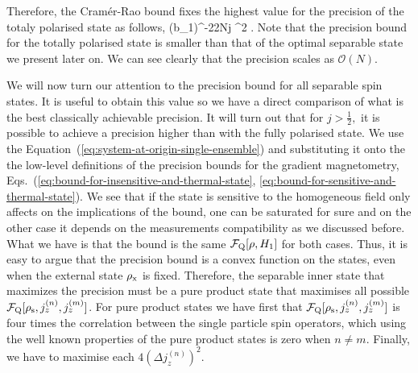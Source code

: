 Therefore, the Cram\'er-Rao bound fixes the highest value for the precision
of the totaly polarised state as follows,
\be
  (\Delta b_1)^{-2}\leq 2Nj \sigma^2 .
\ee
Note that the precision bound for the totally polarised state
is smaller than that of the optimal separable state we present later on.
We can see clearly that the precision scales as $\mathcal{O}(N).$


We will now turn our attention to
the precision bound for all separable spin states.
It is useful to obtain this value so we have a direct comparison of what is
the best classically achievable precision.
It will turn out that for $j>\frac{1}{2},$ it is possible
to achieve a precision higher than with the fully polarised state.
We use the Equation~(\ref{eq:system-at-origin-single-ensemble}) and substituting it onto the the low-level definitions of the precision bounds for the gradient magnetometry, Eqs.~(\ref{eq:bound-for-insensitive-and-thermal-state}, \ref{eq:bound-for-sensitive-and-thermal-state}).
We see that if the state is sensitive to the homogeneous field only affects on the implications of the bound, one can be saturated for sure and on the other case it depends on the measurements compatibility as we discussed before.
What we have is that the bound is the same $\mathcal{F}_{\text{Q}}[\rho, H_1]$ for both cases.
Thus, it is easy to argue that the precision bound is a convex function on the states, even when the external state $\rho_{\rm x}$ is fixed.
Therefore, the separable inner state that maximizes the precision must be a pure product state that maximises all possible $\mathcal{F}_{\text{Q}}[\rho_{\rm s}, j_z^{(n)}, j_z^{(m)}]$.%
For pure product states we have first that $\mathcal{F}_{\text{Q}}[\rho_{\rm s}, j_z^{(n)}, j_z^{(m)}]$ is four times the correlation between the single particle spin operators, which using the well known properties of the pure product states is  zero when $n \neq m$.
Finally, we have to maximise each $4(\Delta j_z^{(n)})^2$.


